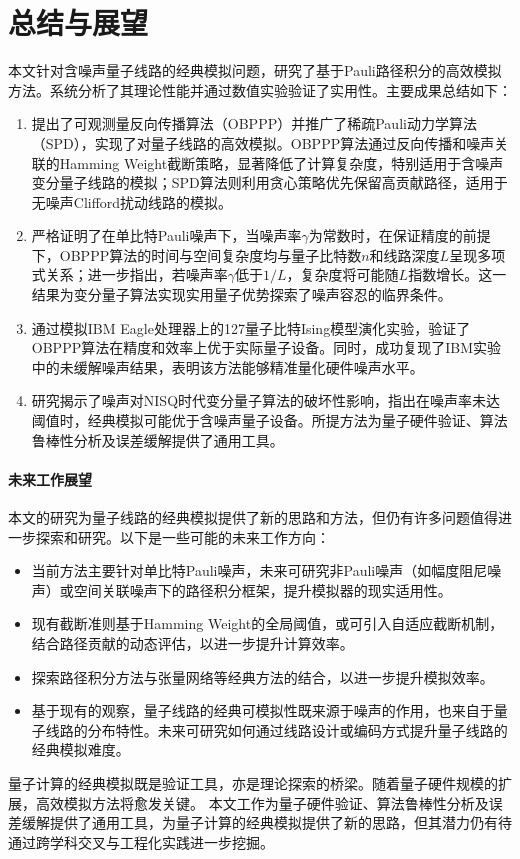 \chapter{总结与展望}


本文针对含噪声量子线路的经典模拟问题，研究了基于Pauli路径积分的高效模拟方法。系统分析了其理论性能并通过数值实验验证了实用性。主要成果总结如下：
\begin{enumerate}
    \item 提出了可观测量反向传播算法（OBPPP）并推广了稀疏Pauli动力学算法（SPD），实现了对量子线路的高效模拟。OBPPP算法通过反向传播和噪声关联的Hamming Weight截断策略，显著降低了计算复杂度，特别适用于含噪声变分量子线路的模拟；SPD算法则利用贪心策略优先保留高贡献路径，适用于无噪声Clifford扰动线路的模拟。
    \item 严格证明了在单比特Pauli噪声下，当噪声率$\gamma$为常数时，在保证精度的前提下，OBPPP算法的时间与空间复杂度均与量子比特数$n$和线路深度$L$呈现多项式关系；进一步指出，若噪声率$\gamma$低于$1/L$，复杂度将可能随$L$指数增长。这一结果为变分量子算法实现实用量子优势探索了噪声容忍的临界条件。
    \item 通过模拟IBM Eagle处理器上的127量子比特Ising模型演化实验，验证了OBPPP算法在精度和效率上优于实际量子设备。同时，成功复现了IBM实验中的未缓解噪声结果，表明该方法能够精准量化硬件噪声水平。
    \item 研究揭示了噪声对NISQ时代变分量子算法的破坏性影响，指出在噪声率未达阈值时，经典模拟可能优于含噪声量子设备。所提方法为量子硬件验证、算法鲁棒性分析及误差缓解提供了通用工具。
\end{enumerate}


\subsubsection{未来工作展望}
本文的研究为量子线路的经典模拟提供了新的思路和方法，但仍有许多问题值得进一步探索和研究。以下是一些可能的未来工作方向：
\begin{itemize}
    \item 当前方法主要针对单比特Pauli噪声，未来可研究非Pauli噪声（如幅度阻尼噪声）或空间关联噪声下的路径积分框架，提升模拟器的现实适用性。
    \item 现有截断准则基于Hamming Weight的全局阈值，或可引入自适应截断机制，结合路径贡献的动态评估，以进一步提升计算效率。
    \item 探索路径积分方法与张量网络等经典方法的结合，以进一步提升模拟效率。
    \item 基于现有的观察，量子线路的经典可模拟性既来源于噪声的作用，也来自于量子线路的分布特性。未来可研究如何通过线路设计或编码方式提升量子线路的经典模拟难度。
\end{itemize}

量子计算的经典模拟既是验证工具，亦是理论探索的桥梁。随着量子硬件规模的扩展，高效模拟方法将愈发关键。
本文工作为量子硬件验证、算法鲁棒性分析及误差缓解提供了通用工具，为量子计算的经典模拟提供了新的思路，但其潜力仍有待通过跨学科交叉与工程化实践进一步挖掘。